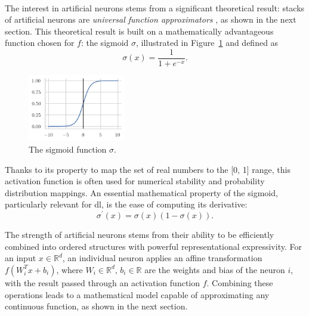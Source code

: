 \paragraph{} The interest in artificial neurons stems from a significant theoretical result: stacks of artificial neurons are \textit{universal function approximators} \cite{universalFuncApproxNN,HORNIK1989359}, as shown in the next section. This theoretical result is built on a mathematically advantageous function chosen for $f$: the sigmoid $\sigma$, illustrated in Figure~\ref{fig:sigmoid} and defined as
\begin{equation}\label{eq:sigmoid}
    \sigma(x) = \frac{1}{1 + e^{-x}}.
\end{equation}
\begin{figure}
    \begin{center}
        \vspace{-0.5cm}
        \includegraphics[width=0.38\textwidth]{Images/ML/sigmoid.png}
        \caption{The sigmoid function $\sigma$.} 
        \label{fig:sigmoid}
    \end{center}
\end{figure}

Thanks to its property to map the set of real numbers to the [0, 1] range, this activation function is often used for numerical stability and probability distribution mappings. An essential mathematical property of the sigmoid, particularly relevant for \gls{dl}, is the ease of computing its derivative: \[\sigma^\prime(x) = \sigma(x) (1- \sigma(x)).\]

\vspace{0.5cm}
The strength of artificial neurons stems from their ability to be efficiently combined into ordered structures with powerful representational expressivity. For an input $x \in \mathbb{R}^d$, an individual neuron applies an affine transformation $f(W_i^T x + b_i)$, where $W_i \in \mathbb{R}^d,\,b_i \in \mathbb{R}$ are the weights and bias of the neuron $i$, with the result passed through an activation function $f$. Combining these operations leads to a mathematical model capable of approximating any continuous function, as shown in the next section. 

